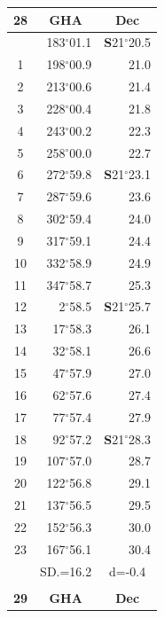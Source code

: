 \documentclass[10pt, a4paper]{report}
\begin{document}
\begin{scriptsize}
\noindent
\begin{tabular*}{0.2\textwidth}[t]{@{\extracolsep{\fill}}|c|rr|}
\hline
\multicolumn{1}{|c|}{\rule{0pt}{2.6ex}\textbf{28}} & \multicolumn{1}{c}{\textbf{GHA}} & \multicolumn{1}{c|}{\textbf{Dec}}\\
\hline\rule{0pt}{2.6ex}\noindent
0 & 183$^\circ$01.1 & \textbf{S}21$^\circ$20.5\\
1 & 198$^\circ$00.9 & 21.0\\
2 & 213$^\circ$00.6 & 21.4\\
3 & 228$^\circ$00.4 & \raisebox{0.24ex}{\boldmath$\cdot$~\boldmath$\cdot$~~}21.8\\
4 & 243$^\circ$00.2 & 22.3\\
5 & 258$^\circ$00.0 & 22.7\\[2Pt]
6 & 272$^\circ$59.8 & \textbf{S}21$^\circ$23.1\\
7 & 287$^\circ$59.6 & 23.6\\
8 & 302$^\circ$59.4 & 24.0\\
9 & 317$^\circ$59.1 & \raisebox{0.24ex}{\boldmath$\cdot$~\boldmath$\cdot$~~}24.4\\
10 & 332$^\circ$58.9 & 24.9\\
11 & 347$^\circ$58.7 & 25.3\\[2Pt]
12 & 2$^\circ$58.5 & \textbf{S}21$^\circ$25.7\\
13 & 17$^\circ$58.3 & 26.1\\
14 & 32$^\circ$58.1 & 26.6\\
15 & 47$^\circ$57.9 & \raisebox{0.24ex}{\boldmath$\cdot$~\boldmath$\cdot$~~}27.0\\
16 & 62$^\circ$57.6 & 27.4\\
17 & 77$^\circ$57.4 & 27.9\\[2Pt]
18 & 92$^\circ$57.2 & \textbf{S}21$^\circ$28.3\\
19 & 107$^\circ$57.0 & 28.7\\
20 & 122$^\circ$56.8 & 29.1\\
21 & 137$^\circ$56.5 & \raisebox{0.24ex}{\boldmath$\cdot$~\boldmath$\cdot$~~}29.5\\
22 & 152$^\circ$56.3 & 30.0\\
23 & 167$^\circ$56.1 & 30.4\\
\hline
\rule{0pt}{2.4ex} & \multicolumn{1}{c}{SD.=16.2} & \multicolumn{1}{c|}{d=-0.4}\\
\hline
\multicolumn{1}{c}{}\\[-0.5ex]\hline
\multicolumn{1}{|c|}{\rule{0pt}{2.6ex}\textbf{29}} & \multicolumn{1}{c}{\textbf{GHA}} & \multicolumn{1}{c|}{\textbf{Dec}}\\

\end{tabular*}
\end{scriptsize}
\end{document}
